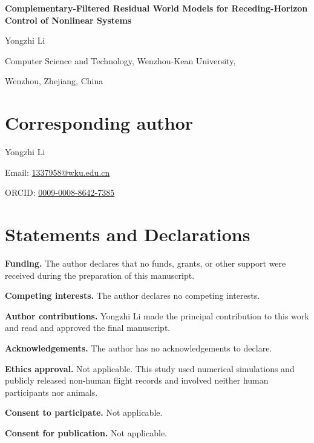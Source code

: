 \documentclass[11pt]{article}
\begin{document}
\begin{center}
{\Large\bfseries Complementary-Filtered Residual World Models for
Receding-Horizon Control of Nonlinear Systems\par}
\vspace{1.3em}
{\large Yongzhi Li\par}
\vspace{0.5em}
Computer Science and Technology, Wenzhou-Kean University,\par
Wenzhou, Zhejiang, China
\end{center}

\section*{Corresponding author}
Yongzhi Li

Email: \href{mailto:1337958@wku.edu.cn}{1337958@wku.edu.cn}

ORCID: \href{https://orcid.org/0009-0008-8642-7385}{0009-0008-8642-7385}

\section*{Statements and Declarations}
\textbf{Funding.} The author declares that no funds, grants, or other support
were received during the preparation of this manuscript.

\textbf{Competing interests.} The author declares no competing interests.

\textbf{Author contributions.} Yongzhi Li made the principal contribution to
this work and read and approved the final manuscript.

\textbf{Acknowledgements.} The author has no acknowledgements to declare.

\textbf{Ethics approval.} Not applicable. This study used numerical
simulations and publicly released non-human flight records and involved neither
human participants nor animals.

\textbf{Consent to participate.} Not applicable.

\textbf{Consent for publication.} Not applicable.
\end{document}
